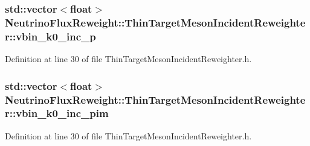 \hypertarget{class_neutrino_flux_reweight_1_1_thin_target_meson_incident_reweighter_a4504e9d8374cd8c8c631d25ceaf35a9d}{
\subsubsection[{vbin\-\_\-k0\-\_\-inc\-\_\-p}]{\setlength{\rightskip}{0pt plus 5cm}std\-::vector$<$float$>$ Neutrino\-Flux\-Reweight\-::\-Thin\-Target\-Meson\-Incident\-Reweighter\-::vbin\-\_\-k0\-\_\-inc\-\_\-p}}\label{class_neutrino_flux_reweight_1_1_thin_target_meson_incident_reweighter_a4504e9d8374cd8c8c631d25ceaf35a9d}


Definition at line 30 of file Thin\-Target\-Meson\-Incident\-Reweighter.\-h.

\hypertarget{class_neutrino_flux_reweight_1_1_thin_target_meson_incident_reweighter_a75f45bee6d5c569d86fb39fc8985c063}{
\subsubsection[{vbin\-\_\-k0\-\_\-inc\-\_\-pim}]{\setlength{\rightskip}{0pt plus 5cm}std\-::vector$<$float$>$ Neutrino\-Flux\-Reweight\-::\-Thin\-Target\-Meson\-Incident\-Reweighter\-::vbin\-\_\-k0\-\_\-inc\-\_\-pim}}\label{class_neutrino_flux_reweight_1_1_thin_target_meson_incident_reweighter_a75f45bee6d5c569d86fb39fc8985c063}


Definition at line 30 of file Thin\-Target\-Meson\-Incident\-Reweighter.\-h.

